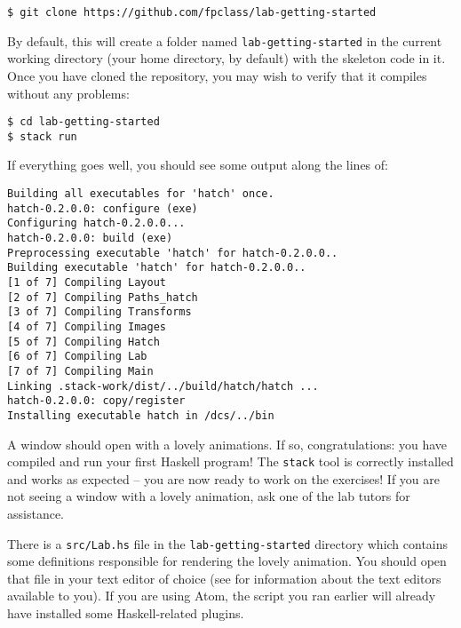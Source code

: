 \begin{verbatim}
$ git clone https://github.com/fpclass/lab-getting-started
\end{verbatim}
By default, this will create a folder named \texttt{\small lab-getting-started} in the current working directory (your home directory, by default) with the skeleton code in it. Once you have cloned the repository, you may wish to verify that it compiles without any problems:
\begin{verbatim}
$ cd lab-getting-started
$ stack run
\end{verbatim}
If everything goes well, you should see some output along the lines of:
\begin{verbatim}
Building all executables for 'hatch' once. 
hatch-0.2.0.0: configure (exe)
Configuring hatch-0.2.0.0...
hatch-0.2.0.0: build (exe)
Preprocessing executable 'hatch' for hatch-0.2.0.0..
Building executable 'hatch' for hatch-0.2.0.0..
[1 of 7] Compiling Layout           
[2 of 7] Compiling Paths_hatch 
[3 of 7] Compiling Transforms   
[4 of 7] Compiling Images   
[5 of 7] Compiling Hatch   
[6 of 7] Compiling Lab     
[7 of 7] Compiling Main  
Linking .stack-work/dist/../build/hatch/hatch ...
hatch-0.2.0.0: copy/register
Installing executable hatch in /dcs/../bin
\end{verbatim}
A window should open with a lovely animations. If so, congratulations: you have compiled and run your first Haskell program! The \texttt{\small stack} tool is correctly installed and works as expected -- you are now ready to work on the exercises! If you are not seeing a window with a lovely animation, ask one of the lab tutors for assistance.

\taskLine 

There is a \texttt{\small src/Lab.hs} file in the \texttt{\small lab-getting-started} directory which contains some definitions responsible for rendering the lovely animation. You should open that file in your text editor of choice (see  for information about the text editors available to you). If you are using Atom, the  script you ran earlier will already have installed some Haskell-related plugins.


